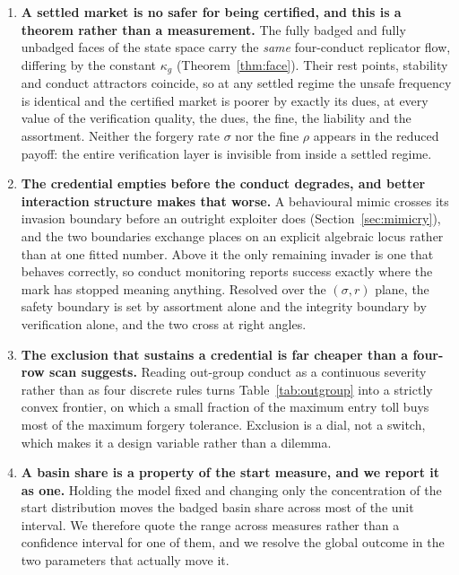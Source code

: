 \documentclass[preprint,12pt]{elsarticle}
\theoremstyle{plain}
\theoremstyle{definition}
\begin{document}
\begin{enumerate}
\item \textbf{A settled market is no safer for being certified, and this is a
theorem rather than a measurement.} The fully badged and fully unbadged faces
of the state space carry the \emph{same} four-conduct replicator flow,
differing by the constant $\kappa_g$ (Theorem~\ref{thm:face}). Their rest
points, stability and conduct attractors coincide, so at any settled regime the
unsafe frequency is identical and the certified market is poorer by exactly its
dues, at every value of the verification quality, the dues, the fine, the
liability and the assortment. Neither the forgery rate $\sigma$ nor the fine
$\rho$ appears in the reduced payoff: the entire verification layer is
invisible from inside a settled regime.

\item \textbf{The credential empties before the conduct degrades, and better
interaction structure makes that worse.} A behavioural mimic crosses its
invasion boundary before an outright exploiter does
(Section~\ref{sec:mimicry}), and the two boundaries exchange places on an
explicit algebraic locus rather than at one fitted number. Above it the only
remaining invader is one that behaves correctly, so conduct monitoring reports
success exactly where the mark has stopped meaning anything. Resolved over the
$(\sigma, r)$ plane, the safety boundary is set by assortment alone and the
integrity boundary by verification alone, and the two cross at right angles.

\item \textbf{The exclusion that sustains a credential is far cheaper than a
four-row scan suggests.} Reading out-group conduct as a continuous severity
rather than as four discrete rules turns Table~\ref{tab:outgroup} into a
strictly convex frontier, on which a small fraction of the maximum entry toll
buys most of the maximum forgery tolerance. Exclusion is a dial, not a switch,
which makes it a design variable rather than a dilemma.

\item \textbf{A basin share is a property of the start measure, and we report
it as one.} Holding the model fixed and changing only the concentration of the
start distribution moves the badged basin share across most of the unit
interval. We therefore quote the range across measures rather than a confidence
interval for one of them, and we resolve the global outcome in the two
parameters that actually move it.
\end{enumerate}
\end{document}
